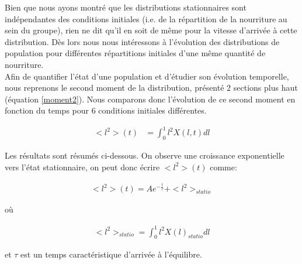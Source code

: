 Bien que nous ayons montré que les distributions stationnaires sont indépendantes des conditions initiales (i.e. de la répartition de la nourriture au sein du groupe), rien ne dit qu'il en soit de même pour la vitesse d'arrivée à cette distribution. Dès lors nous nous intéressons à l'évolution des distributions de population pour différentes répartitions initiales d'une même quantité de nourriture.\\

Afin de quantifier l'état d'une population et d'étudier son évolution temporelle, nous reprenons le second moment de la distribution, présenté 2 sections plus haut (équation \ref{moment2}). Nous comparons donc l'évolution de ce second moment en fonction du temps pour 6 conditions initiales différentes. 

\begin{equation}
\begin{aligned}
<l^2>(t) &= \int_0^1 l^2 X(l,t) dl 
\end{aligned}
\label{moment2}
\end{equation}


Les résultats sont résumés ci-dessous. On observe une croissance exponentielle vers l'état stationnaire, on peut donc écrire $<l^2>(t)$ comme:

\begin{equation}
\begin{aligned}
<l^2>(t)=A e^{-\frac{t}{\tau}}+<l^2>_{statio}
\end{aligned}
\end{equation}

où

\begin{equation}
\begin{aligned}
<l^2>_{statio}= \int_0^1 l^2 X(l)_{statio} dl
\end{aligned}
\end{equation}

et $\tau$ est un temps caractéristique d'arrivée à l'équilibre.